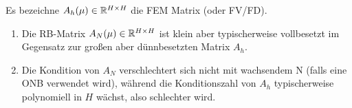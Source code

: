 \begin{bem}
	Es bezeichne $A_h(\mu) \in \mathbb{R}^{H \times H}$ die FEM Matrix (oder FV/FD).
	\begin{enumerate}
		\item Die RB-Matrix $A_N(\mu) \in \mathbb{R}^{H \times H}$ ist klein aber typischerweise vollbesetzt im Gegensatz zur großen aber dünnbesetzten Matrix $A_h$.
		\item Die Kondition von $A_N$ verschlechtert sich nicht mit wachsendem N (falls eine ONB verwendet wird), während die Konditionszahl von $A_h$ typischerweise polynomiell in $H$ wächst, also schlechter wird.
	\end{enumerate}
\end{bem}

